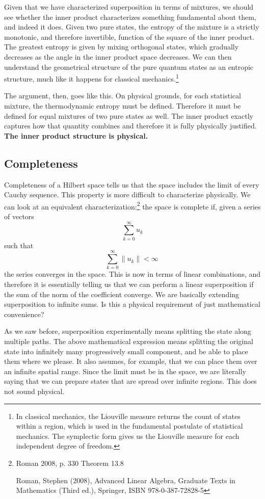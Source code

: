 \documentclass[10pt,twocolumn, nofootinbib]{revtex4-2}
\begin{document}
Given that we have characterized superposition in terms of mixtures, we should see whether the inner product characterizes something fundamental about them, and indeed it does. Given two pure states, the entropy of the mixture is a strictly monotonic, and therefore invertible, function of the square of the inner product. The greatest entropy is given by mixing orthogonal states, which gradually decreases as the angle in the inner product space decreases. We can then understand the geometrical structure of the pure quantum states as an entropic structure, much like it happens for classical mechanics.\footnote{In classical mechanics, the Liouville measure returns the count of states within a region, which is used in the fundamental postulate of statistical mechanics. The symplectic form gives us the Liouville measure for each independent degree of freedom.}

The argument, then, goes like this. On physical grounds, for each statistical mixture, the thermodynamic entropy must be defined. Therefore it must be defined for equal mixtures of two pure states as well. The inner product exactly captures how that quantity combines and therefore it is fully physically justified. \textbf{The inner product structure is physical.}

\subsection{Completeness}

Completeness of a Hilbert space tells us that the space includes the limit of every Cauchy sequence. This property is more difficult to characterize physically. We can look at an equivalent characterization:\footnote{Roman 2008, p. 330 Theorem 13.8
	
	Roman, Stephen (2008), Advanced Linear Algebra, Graduate Texts in Mathematics (Third ed.), Springer, ISBN 978-0-387-72828-5} the space is complete if, given a series of vectors
$$ \sum _{k=0}^{\infty }u_{k}$$
such that
$$ \sum _{k=0}^{\infty }\|u_{k}\|<\infty \,$$
the series converges in the space. This is now in terms of linear combinations, and therefore it is essentially telling us that we can perform a linear superposition if the sum of the norm of the coefficient converge. We are basically extending superposition to infinite sums. Is this a physical requirement of just mathematical convenience?

As we saw before, superposition experimentally means splitting the state along multiple paths. The above mathematical expression means splitting the original state into infinitely many progressively small component, and be able to place them where we please. It also assumes, for example, that we can place them over an infinite spatial range. Since the limit must be in the space, we are literally saying that we can prepare states that are spread over infinite regions. This does not sound physical.
\end{document}
